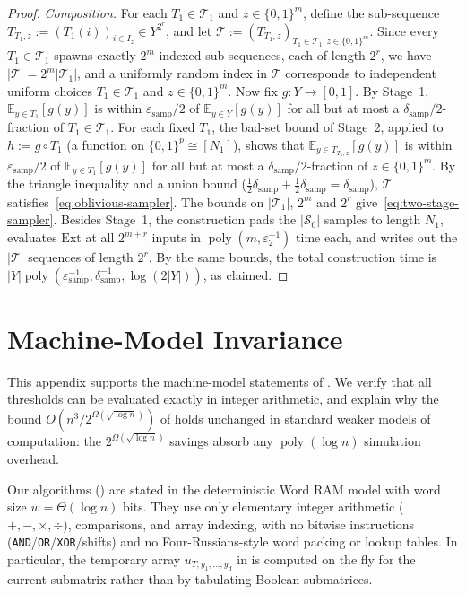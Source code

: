 \documentclass[11pt]{article}
\theoremstyle{definition}
\renewcommand{\label}[1]{}%
\newcommand{\E}{\mathbb{E}}
\newcommand{\poly}{\operatorname{poly}}
\newcommand{\abs}[1]{\left\lvert #1 \right\rvert}
\begin{document}
\begin{proof}
\emph{Composition.} For each $T_1 \in \mathcal{T}_1$ and $z \in \{0, 1\}^m$, define the sub-sequence $T_{T_1, z} := (T_1(i))_{i \in I_z} \in Y^{2^r}$, and let $\mathcal{T} := (T_{T_1, z})_{T_1 \in \mathcal{T}_1, z \in \{0, 1\}^m}$. Since every $T_1 \in \mathcal{T}_1$ spawns exactly $2^m$ indexed sub-sequences, each of length $2^r$, we have $\abs{\mathcal{T}} = 2^m\abs{\mathcal{T}_1}$, and a uniformly random index in $\mathcal{T}$ corresponds to independent uniform choices $T_1 \in \mathcal{T}_1$ and $z \in \{0, 1\}^m$. Now fix $g : Y \to [0, 1]$. By Stage~1, $\E_{y \in T_1}[g(y)]$ is within $\varepsilon_{\text{samp}}/2$ of $\E_{y \in Y}[g(y)]$ for all but at most a $\delta_{\text{samp}}/2$-fraction of $T_1 \in \mathcal{T}_1$. For each fixed $T_1$, the bad-set bound of Stage~2, applied to $h := g \circ T_1$ (a function on $\{0, 1\}^p \cong [N_1]$), shows that $\E_{y \in T_{T_1, z}}[g(y)]$ is within $\varepsilon_{\text{samp}}/2$ of $\E_{y \in T_1}[g(y)]$ for all but at most a $\delta_{\text{samp}}/2$-fraction of $z \in \{0, 1\}^m$. By the triangle inequality and a union bound ($\frac{1}{2}\delta_{\text{samp}} + \frac{1}{2}\delta_{\text{samp}} = \delta_{\text{samp}}$), $\mathcal{T}$ satisfies~\eqref{eq:oblivious-sampler}. The bounds on $\abs{\mathcal{T}_1}$, $2^m$ and $2^r$ give~\eqref{eq:two-stage-sampler}. Besides Stage~1, the construction pads the $\abs{\mathcal{S}_0}$ samples to length $N_1$, evaluates $\mathrm{Ext}$ at all $2^{m+r}$ inputs in $\poly(m, \varepsilon_2^{-1})$ time each, and writes out the $\abs{\mathcal{T}}$ sequences of length $2^r$. By the same bounds, the total construction time is $\abs{Y}\poly(\varepsilon_{\text{samp}}^{-1}, \delta_{\text{samp}}^{-1}, \log(2\abs{Y}))$, as claimed.
\end{proof}

\section{Machine-Model Invariance}
\label{app:models}

This appendix supports the machine-model statements of . We verify that all thresholds can be evaluated exactly in integer arithmetic, and explain why the bound $O(n^3 / 2^{\Omega(\sqrt{\log n})})$ of  holds unchanged in standard weaker models of computation: the $2^{\Omega(\sqrt{\log n})}$ savings absorb any $\poly(\log n)$ simulation overhead.

Our algorithms () are stated in the deterministic Word RAM model with word size $w = \Theta(\log n)$ bits. They use only elementary integer arithmetic ($+, -, \times, \div$), comparisons, and array indexing, with no bitwise instructions (\texttt{AND}/\texttt{OR}/\texttt{XOR}/shifts) and no Four-Russians-style word packing or lookup tables. In particular, the temporary array $u_{T, y_1, \dots, y_d}$ in  is computed on the fly for the current submatrix rather than by tabulating Boolean submatrices.
\end{document}
